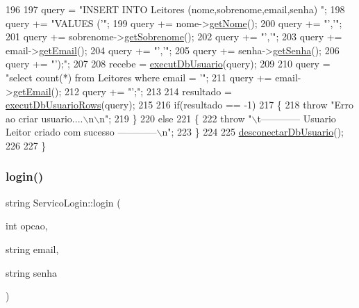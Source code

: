 \begin{DoxyCode}
196 
197   query = \textcolor{stringliteral}{"INSERT INTO Leitores (nome,sobrenome,email,senha) "};
198   query += \textcolor{stringliteral}{"VALUES ('"};
199   query += nome->\mbox{\hyperlink{class_nome_aad41176173eec20cbbae1576447a3697}{getNome}}();
200   query += \textcolor{stringliteral}{"','"};
201   query += sobrenome->\mbox{\hyperlink{class_sobrenome_a954491366ce07f6715f32a97d67edf04}{getSobrenome}}();
202   query += \textcolor{stringliteral}{"','"};
203   query += email->\mbox{\hyperlink{class_email_aa9a0e1a66b4efde65cf017bdd1c6c625}{getEmail}}();
204   query += \textcolor{stringliteral}{"','"};
205   query += senha->\mbox{\hyperlink{class_senha_a8786b3d03b1652e73df1cdce46cbbaaf}{getSenha}}();
206   query += \textcolor{stringliteral}{"');"};
207 
208   recebe = \mbox{\hyperlink{comando_sql_8cpp_a748197580e7f9acdbf48c78de1f7924b}{executDbUsuario}}(query);
209 
210   query = \textcolor{stringliteral}{"select count(*) from Leitores where email = '"};
211   query += email->\mbox{\hyperlink{class_email_aa9a0e1a66b4efde65cf017bdd1c6c625}{getEmail}}();
212   query += \textcolor{stringliteral}{"';"};
213 
214   resultado = \mbox{\hyperlink{comando_sql_8cpp_af54952694f2fa7d76f969fb74b853cb9}{executDbUsuarioRows}}(query);
215 
216   \textcolor{keywordflow}{if}(resultado == -1)
217   \{
218     \textcolor{keywordflow}{throw} \textcolor{stringliteral}{"Erro ao criar usuario....\(\backslash\)n\(\backslash\)n"};
219   \}
220   \textcolor{keywordflow}{else}
221   \{
222     \textcolor{keywordflow}{throw} \textcolor{stringliteral}{"\(\backslash\)t------------ Usuario Leitor criado com sucesso ------------\(\backslash\)n"};
223   \}
224 
225   \mbox{\hyperlink{comando_sql_8cpp_a969be9911913568e30d4ae8963338bc3}{desconectarDbUsuario}}();
226 
227 \}
\end{DoxyCode}
\mbox{\label{class_servico_login_a0dd44bd72da82fa932e4929edbefb6ea}} 
\subsubsection{\texorpdfstring{login()}{login()}}
{\footnotesize\ttfamily string Servico\+Login\+::login (\begin{DoxyParamCaption}\item[{int}]{opcao,  }\item[{string}]{email,  }\item[{string}]{senha }\end{DoxyParamCaption})\hspace{0.3cm}{\ttfamily [virtual]}}

